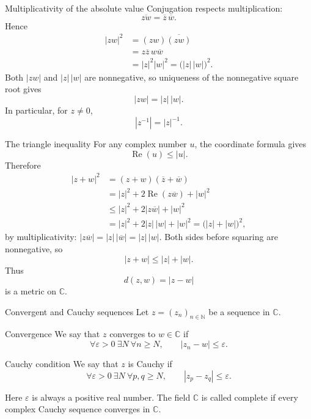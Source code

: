 \documentclass[aspectratio=169,11pt]{beamer}
\newcommand{\N}{\mathbb N}
\newcommand{\C}{\mathbb C}
\begin{document}
\begin{frame}{Multiplicativity of the absolute value}
  Conjugation respects multiplication:
  \[
    \overline{zw}=\overline z\,\overline w.
  \]
  Hence
  \begin{align*}
    |zw|^2
      &=(zw)\overline{(zw)}\\
      &=z\overline z\,w\overline w\\
      &=|z|^2|w|^2
       =\bigl(|z|\,|w|\bigr)^2.
  \end{align*}
  Both \(|zw|\) and \(|z|\,|w|\) are nonnegative, so uniqueness of the
  nonnegative square root gives
  \[
    \boxed{|zw|=|z|\,|w|.}
  \]
  In particular, for \(z\ne0\),
  \[
    |z^{-1}|=|z|^{-1}.
  \]
\end{frame}

\begin{frame}{The triangle inequality}
  \small
  For any complex number \(u\), the coordinate formula gives
  \[
    \operatorname{Re}(u)\le|u|.
  \]
  Therefore
  \begin{align*}
    |z+w|^2
      &=(z+w)(\overline z+\overline w)\\
      &=|z|^2+2\operatorname{Re}(z\overline w)+|w|^2\\
      &\le|z|^2+2|z\overline w|+|w|^2\\
      &=|z|^2+2|z|\,|w|+|w|^2
       =\bigl(|z|+|w|\bigr)^2,
  \end{align*}
  by multiplicativity: \(|z\overline w|=|z|\,|\overline w|=|z|\,|w|\).
  Both sides before squaring are nonnegative, so
  \[
    \boxed{|z+w|\le|z|+|w|.}
  \]
  Thus
  \[
    d(z,w)=|z-w|
  \]
  is a metric on \(\C\).
\end{frame}

\begin{frame}{Convergent and Cauchy sequences}
  Let \(z=(z_n)_{n\in\N}\) be a sequence in \(\C\).

  \begin{block}{Convergence}
    We say that \(z\) \alert{converges} to \(w\in\C\) if
    \[
      \forall\varepsilon>0\ \exists N\ \forall n\ge N,
      \qquad |z_n-w|\le\varepsilon.
    \]
  \end{block}

  \begin{block}{Cauchy condition}
    We say that \(z\) is \alert{Cauchy} if
    \[
      \forall\varepsilon>0\ \exists N\ \forall p,q\ge N,
      \qquad |z_p-z_q|\le\varepsilon.
    \]
  \end{block}
  Here \(\varepsilon\) is always a positive real number.  The field \(\C\)
  is called \alert{complete} if every complex Cauchy sequence converges in
  \(\C\).
\end{frame}
\end{document}

